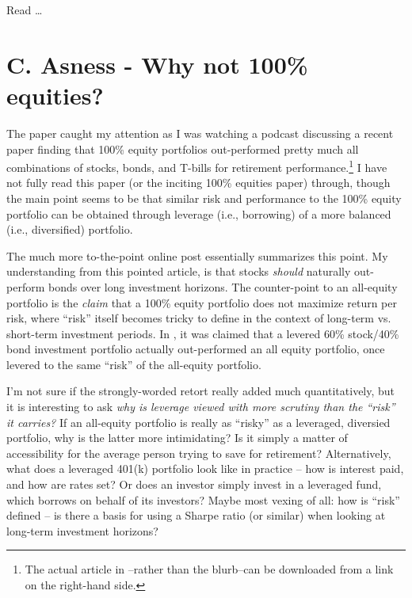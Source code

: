 \documentclass{article}
\begin{document}
Read \cite{Ikenberry1995}\ldots


\section{C. Asness - Why not 100\% equities?}

The paper \cite{Asness1996} caught my attention as I was watching a podcast discussing a recent paper finding that 100\% equity portfolios out-performed pretty much all combinations of stocks, bonds, and T-bills for retirement performance.\footnote{The actual article in \cite{Asness1996}--rather than the blurb--can be downloaded from a link on the right-hand side.}  I have not fully read this paper (or the inciting 100\% equities paper) through, though the main point seems to be that similar risk and performance to the 100\% equity portfolio can be obtained through leverage (i.e., borrowing) of a more balanced (i.e., diversified) portfolio.

The much more to-the-point online post \cite{Asness2024} essentially summarizes this point.  My understanding from this pointed article, is that stocks {\it should} naturally out-perform bonds over long investment horizons.  The counter-point to an all-equity portfolio is the {\it claim} that a 100\% equity portfolio does not maximize return per risk, where ``risk'' itself becomes tricky to define in the context of long-term vs. short-term investment periods.  In \cite{Asness1996}, it was claimed that a levered 60\% stock/40\% bond investment portfolio actually out-performed an all equity portfolio, once levered to the same ``risk'' of the all-equity portfolio.

I'm not sure if the strongly-worded retort really added much quantitatively, but it is interesting to ask {\it why is leverage viewed with more scrutiny than the ``risk'' it carries?}  If an all-equity portfolio is really as ``risky'' as a leveraged, diversied portfolio, why is the latter more intimidating?  Is it simply a matter of accessibility for the average person trying to save for retirement?  Alternatively, what does a leveraged 401(k) portfolio look like in practice -- how is interest paid, and how are rates set?  Or does an investor simply invest in a leveraged fund, which borrows on behalf of its investors?  Maybe most vexing of all: how is ``risk'' defined -- is there a basis for using a Sharpe ratio (or similar) when looking at long-term investment horizons?
\end{document}
